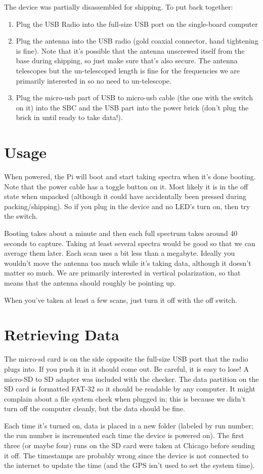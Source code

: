 \documentclass[12pt,letter]{article}
\begin{document}
The device was partially disassembled for shipping. To put back together: 
\begin{enumerate} 
\item Plug the USB Radio into the full-size USB port on the single-board computer
\item Plug the antenna into the USB radio (gold coaxial connector, hand tightening is fine). Note that it's possible that the antenna unscrewed itself from the base during shipping, so just make sure that's also secure. The antenna telescopes but the un-telescoped length is fine for the frequencies we are primarily interested in so no need to un-telescope. 
\item Plug the micro-usb part of USB to micro-usb cable (the one with the switch on it) into the SBC and the USB part into the power brick (don't plug the brick in until ready to take data!). 
\end{enumerate} 

\section{Usage} 

When powered, the Pi will boot and start taking spectra when it's done booting.
Note that the power cable has a toggle button on it.  Most likely it is in the
off state when unpacked (although it could have accidentally been pressed
during packing/shipping). So if you plug in the device and no LED's turn on,
then try the switch.

Booting takes about a minute and then each full spectrum takes around 40
seconds to capture.  Taking at least several spectra would be good so that we
can average them later. Each scan uses a bit less than a megabyte. Ideally you
wouldn't move the antenna too much while it's taking data, although it doesn't
matter so much. We are primarily interested in vertical polarization, so that
means that the antenna should roughly be pointing up. 

When you've taken at least a few scans, just turn it off with the off switch. 

\section{Retrieving Data} 

The micro-sd card is on the side opposite the full-size USB port that the radio
plugs into. If you push it in it should come out. Be careful, it is easy to
lose! A micro-SD to SD adapter was included with the checker. The data
partition on the SD card is formatted FAT-32 so it should be readable by any
computer. It might complain about a file system check when plugged in; this is
because we didn't turn off the computer cleanly, but the data should be fine. 

Each time it's turned on, data is placed in a new folder (labeled by run
number; the run number is incremented each time the device is powered on). The
first three (or maybe four) runs on the SD card were taken at Chicago before
sending it off.  The timestamps are probably wrong since the device is not
connected to the internet to update the time (and the GPS isn't used to set the
system time). 
\end{document}
